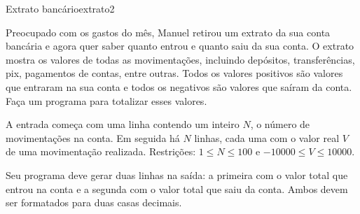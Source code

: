 \documentclass[12pt,a4paper,oneside]{article}
\begin{document}
\begin{problem}{Extrato bancário}{extrato}{2}

Preocupado com os gastos do mês, Manuel retirou um extrato da sua conta bancária e agora quer saber quanto entrou e quanto saiu da sua conta.
O extrato mostra os valores de todas as movimentações, incluindo depósitos, transferências, pix, pagamentos de contas, entre outras.
Todos os valores positivos são valores que entraram na sua conta e todos os negativos são valores que saíram da conta. Faça um programa para totalizar esses valores.

%

\InputFile

A entrada começa com uma linha contendo um inteiro $N$, o número de movimentações na conta.
Em seguida há $N$ linhas, cada uma com o valor real $V$ de uma movimentação realizada.
Restrições: $1 \leq N \leq 100$ e $-10000 \leq V \leq 10000$.

\OutputFile

Seu programa deve gerar duas linhas na saída: a primeira com o valor total que entrou na conta e a segunda com o valor total que saiu da conta.
Ambos devem ser formatados para duas casas decimais.


\Example

\begin{example}
%
\end{example}

\begin{example}
%
\end{example}

\begin{example}
%
\end{example}


\end{problem}
\end{document}
